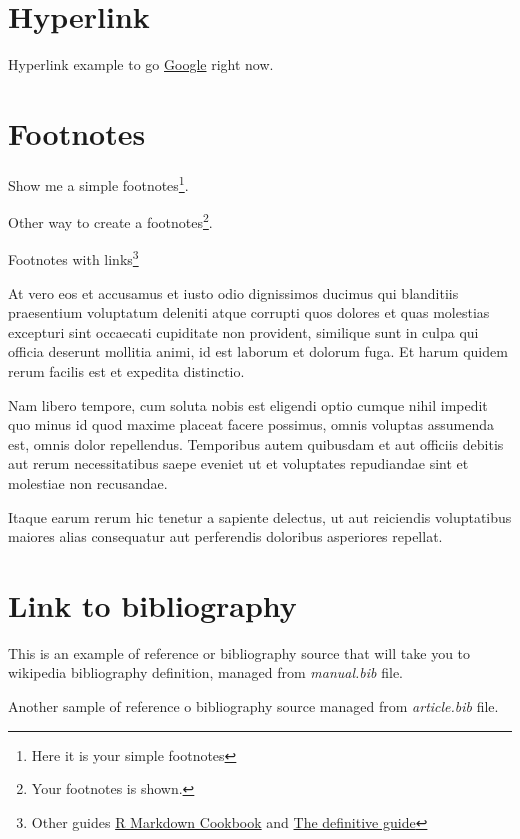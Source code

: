 \documentclass[
  english,
  a4paper,
  openany]{book}
\begin{document}
\hypertarget{hyperlink}{%
\chapter{Hyperlink}\label{hyperlink}}

Hyperlink example to go \href{https://www.google.com}{Google} right now.

\hypertarget{footnotes}{%
\chapter{Footnotes}\label{footnotes}}

Show me a simple footnotes\footnote{Here it is your simple footnotes}.

Other way to create a footnotes\footnote{Your footnotes is shown.}.

Footnotes with links\footnote{Other guides \href{https://bookdown.org/yihui/rmarkdown-cookbook/}{R Markdown Cookbook} and \href{https://bookdown.org/yihui/rmarkdown/}{The definitive guide}}

At vero eos et accusamus et iusto odio dignissimos ducimus qui blanditiis praesentium voluptatum deleniti atque corrupti quos dolores et quas molestias excepturi sint occaecati cupiditate non provident, similique sunt in culpa qui officia deserunt mollitia animi, id est laborum et dolorum fuga. Et harum quidem rerum facilis est et expedita distinctio.

Nam libero tempore, cum soluta nobis est eligendi optio cumque nihil impedit quo minus id quod maxime placeat facere possimus, omnis voluptas assumenda est, omnis dolor repellendus. Temporibus autem quibusdam et aut officiis debitis aut rerum necessitatibus saepe eveniet ut et voluptates repudiandae sint et molestiae non recusandae.

Itaque earum rerum hic tenetur a sapiente delectus, ut aut reiciendis voluptatibus maiores alias consequatur aut perferendis doloribus asperiores repellat.

\hypertarget{link-to-bibliography}{%
\chapter{Link to bibliography}\label{link-to-bibliography}}

This is an example of reference or bibliography source \citep{example-ref} that will take you to wikipedia bibliography definition, managed from \emph{manual.bib} file.

Another sample of reference o bibliography source \citep{article} managed from \emph{article.bib} file.
\end{document}
